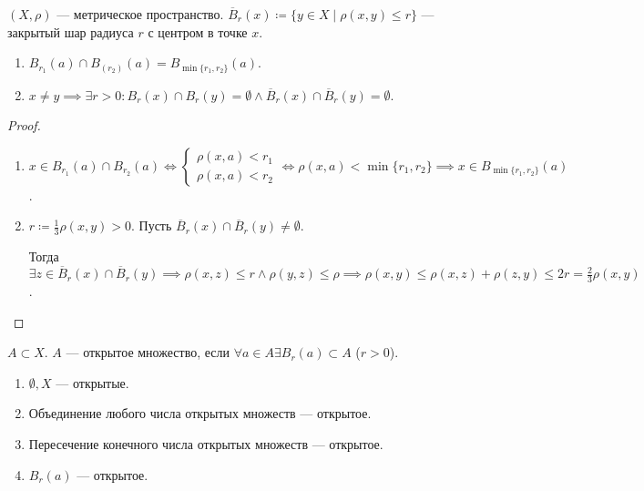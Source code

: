 \begin{definition}
    $(X, \rho)$ --- метрическое пространство.  $\overline{B}_r(x) \coloneqq \{y \in X \mid \rho(x, y) \le r\}$ --- закрытый шар радиуса  $r$ с центром в точке  $x$. 
\end{definition}
\begin{properties}
    \begin{enumerate}
        \item $B_{r_1}(a) \cap B_(r_2)(a) = B_{\min\{r_1, r_2\}}(a)$.
        \item $x \neq y \implies \exists r > 0\!: B_r(x) \cap B_r(y) = \emptyset \land \overline{B}_r(x) \cap \overline{B}_r(y) = \emptyset$.
    \end{enumerate}
\end{properties}
\begin{proof}
    \begin{enumerate}
        \item $x \in B_{r_1}(a) \cap B_{r_2}(a) \iff \begin{cases} \rho(x, a) < r_1 \\ \rho(x, a) < r_2 \end{cases} \iff \rho(x, a) < \min\{r_1, r_2\} \implies x \in B_{\min\{r_1, r_2\}}(a)$.
        \item $r \coloneqq \frac{1}{3} \rho(x, y) > 0$. Пусть $\overline{B}_r(x) \cap \overline{B}_r(y) \neq \emptyset$. 

            Тогда  $\exists z \in \overline{B}_r(x) \cap \overline{B}_r(y) \implies \rho(x, z) \le r \land \rho(y, z) \le \rho \implies \rho(x, y) \le \rho(x, z) + \rho(z, y) \le 2r = \frac{2}{3} \rho(x, y)$.
    \end{enumerate}
\end{proof}
\begin{definition}
    $A \subset X$.  $A$ --- открытое множество, если  $\forall a \in A \exists B_r(a) \subset A$ ($r > 0$).
\end{definition}
\begin{theorem}
    \begin{enumerate}
        \item $\emptyset, X$ --- открытые.
        \item Объединение любого числа открытых множеств --- открытое.
        \item Пересечение конечного числа открытых множеств --- открытое.
        \item $B_r(a)$ --- открытое.
    \end{enumerate}
\end{theorem}
